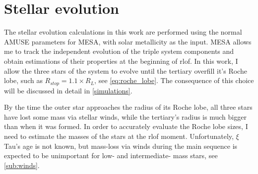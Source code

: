 \section{Stellar evolution}\label{sec:stellar_evolution}

The stellar evolution calculations in this work are performed using the normal AMUSE parameters for MESA, with solar metallicity as the input.
MESA allows me to track the independent evolution of the triple system components and obtain estimations of their properties at the beginning of \ac{rlof}. In this work, I allow the three stars of the system to evolve until the tertiary overfill it's Roche lobe, such as $R_{stop} = 1.1 \times R_{L}$, see \cref{eq:roche_lobe}. The consequence of this choice will be discussed in detail in \cref{simulations}.

By the time the outer star approaches the radius of its Roche lobe, all three stars have lost some mass via stellar winds, while the tertiary's radius is much bigger than when it was formed. In order to accurately evaluate the Roche lobe sizes, I need to estimate the masses of the stars at the \ac{rlof} moment. Unfortunately, $\xi$ Tau's age is not known, but mass-loss via winds during the main sequence is expected to be unimportant for low- and intermediate- mass stars, see \cref{sub:winds}.

